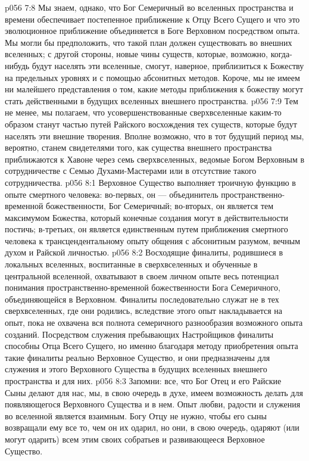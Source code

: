 \vs p056 7:8 Мы знаем, однако, что Бог Семеричный во вселенных пространства и времени обеспечивает постепенное приближение к Отцу Всего Сущего и что это эволюционное приближение объединяется в Боге Верховном посредством опыта. Мы могли бы предположить, что такой план должен существовать во внешних вселенных; с другой стороны, новые чины существ, которые, возможно, когда\hyp{}нибудь будут населять эти вселенные, смогут, наверное, приблизиться к Божеству на предельных уровнях и с помощью абсонитных методов. Короче, мы не имеем ни малейшего представления о том, какие методы приближения к божеству могут стать действенными в будущих вселенных внешнего пространства.
\vs p056 7:9 Тем не менее, мы полагаем, что усовершенствованные сверхвселенные каким\hyp{}то образом станут частью путей Райского восхождения тех существ, которые будут населять эти внешние творения. Вполне возможно, что в тот будущий период мы, вероятно, станем свидетелями того, как существа внешнего пространства приближаются к Хавоне через семь сверхвселенных, ведомые Богом Верховным в сотрудничестве с Семью Духами\hyp{}Мастерами или в отсутствие такого сотрудничества.
\vs p056 8:1 Верховное Существо выполняет троичную функцию в опыте смертного человека: во\hyp{}первых, он --- объединитель пространственно\hyp{}временной божественности, Бог Семеричный; во\hyp{}вторых, он является тем максимумом Божества, который конечные создания могут в действительности постичь; в\hyp{}третьих, он является единственным путем приближения смертного человека к трансцендентальному опыту общения с абсонитным разумом, вечным духом и Райской личностью.
\vs p056 8:2 Восходящие финалиты, родившиеся в локальных вселенных, воспитанные в сверхвселенных и обученные в центральной вселенной, охватывают в своем личном опыте весь потенциал понимания пространственно\hyp{}временной божественности Бога Семеричного, объединяющейся в Верховном. Финалиты последовательно служат не в тех сверхвселенных, где они родились, вследствие этого опыт накладывается на опыт, пока не охвачена вся полнота семеричного разнообразия возможного опыта созданий. Посредством служения пребывающих Настройщиков финалиты способны  Отца Всего Сущего, но именно благодаря методу приобретения опыта такие финалиты реально  Верховное Существо, и они предназначены для служения и  этого Верховного Существа в будущих вселенных внешнего пространства и для них.
\vs p056 8:3 Запомни: все, что Бог Отец и его Райские Сыны делают для нас, мы, в свою очередь в духе, имеем возможность делать для появляющегося Верховного Существа и в нем. Опыт любви, радости и служения во вселенной является взаимным. Богу Отцу не нужно, чтобы его сыны возвращали ему все то, чем он их одарил, но они, в свою очередь, одаряют (или могут одарить) всем этим своих собратьев и развивающееся Верховное Существо.
